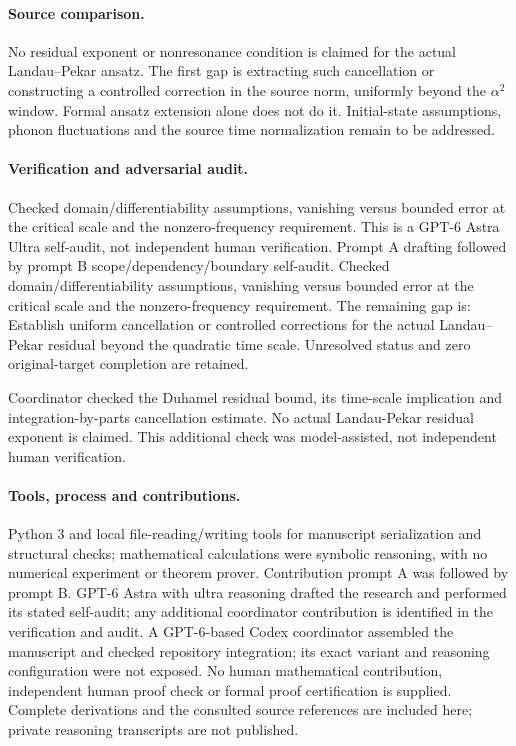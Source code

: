 \documentclass[11pt]{article}
\begin{document}
\paragraph{Source comparison.} No residual exponent or nonresonance condition is claimed for the actual Landau--Pekar ansatz. The first gap is extracting such cancellation or constructing a controlled correction in the source norm, uniformly beyond the \(\alpha^2\) window. Formal ansatz extension alone does not do it. Initial-state assumptions, phonon fluctuations and the source time normalization remain to be addressed.

\paragraph{Verification and adversarial audit.}
Checked domain/differentiability assumptions, vanishing versus bounded error at the critical scale and the nonzero-frequency requirement. This is a GPT-6 Astra Ultra self-audit, not independent human verification. Prompt A drafting followed by prompt B scope/dependency/boundary self-audit. Checked domain/differentiability assumptions, vanishing versus bounded error at the critical scale and the nonzero-frequency requirement. The remaining gap is: Establish uniform cancellation or controlled corrections for the actual Landau–Pekar residual beyond the quadratic time scale. Unresolved status and zero original-target completion are retained.

Coordinator checked the Duhamel residual bound, its time-scale implication and integration-by-parts cancellation estimate. No actual Landau-Pekar residual exponent is claimed. This additional check was model-assisted, not independent human verification.

\paragraph{Tools, process and contributions.}
Python 3 and local file-reading/writing tools for manuscript serialization and structural checks; mathematical calculations were symbolic reasoning, with no numerical experiment or theorem prover. Contribution prompt A was followed by prompt B. GPT-6 Astra with ultra reasoning drafted the research and performed its stated self-audit; any additional coordinator contribution is identified in the verification and audit. A GPT-6-based Codex coordinator assembled the manuscript and checked repository integration; its exact variant and reasoning configuration were not exposed. No human mathematical contribution, independent human proof check or formal proof certification is supplied. Complete derivations and the consulted source references are included here; private reasoning transcripts are not published.
\end{document}
